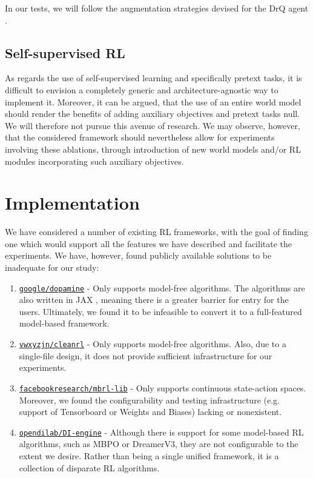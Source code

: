 \documentclass[en]{pracamgr}
\begin{document}
In our tests, we will follow the augmentation strategies devised for the DrQ agent \autocite{kostrikovImageAugmentationAll2021}.

\subsection{Self-supervised RL}

As regards the use of self-supervised learning and specifically pretext tasks, it is difficult to envision a completely generic and architecture-agnostic way to implement it. Moreover, it can be argued, that the use of an entire world model should render the benefits of adding auxiliary objectives and pretext tasks null. We will therefore not pursue this avenue of research. We may observe, however, that the considered framework should nevertheless allow for experiments involving these ablations, through introduction of new world models and/or RL modules incorporating such auxiliary objectives.

\section{Implementation}

We have considered a number of existing RL frameworks, with the goal of finding one which would support all the features we have described and facilitate the experiments. We have, however, found publicly available solutions to be inadequate for our study:

\begin{enumerate}
  \item \href{https://github.com/google/dopamine}{\tt {google/dopamine}} \autocite{castro18dopamine} - Only supports model-free algorithms. The algorithms are also written in JAX \autocite{jax2018github}, meaning there is a greater barrier for entry for the users. Ultimately, we found it to be infeasible to convert it to a full-featured model-based framework.
  \item \href{https://github.com/vwxyzjn/cleanrl}{\tt {vwxyzjn/cleanrl}} \autocite{huang2022cleanrl} - Only supports model-free algorithms. Also, due to a single-file design, it does not provide sufficient infrastructure for our experiments.
  \item \href{https://github.com/facebookresearch/mbrl-lib}{\tt {facebookresearch/mbrl-lib}} \autocite{pinedaMBRLLibModularLibrary2021} - Only supports continuous state-action spaces. Moreover, we found the configurability and testing infrastructure (e.g. support of Tensorboard or Weights and Biases) lacking or nonexistent.
  \item \href{https://github.com/opendilab/DI-engine}{\tt {opendilab/DI-engine}} \autocite{ding21diengine} - Although there is support for some model-based RL algorithms, such as MBPO or DreamerV3, they are not configurable to the extent we desire. Rather than being a single unified framework, it is a collection of disparate RL algorithms.
\end{enumerate}
\end{document}
